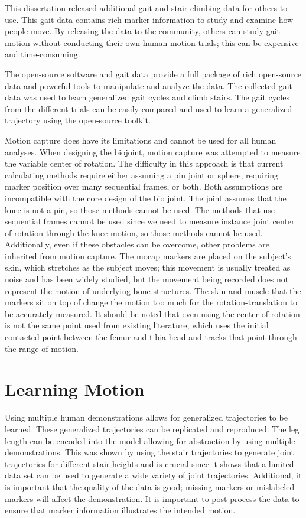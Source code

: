 This dissertation released additional gait and stair climbing data for others to use. This gait data contains rich marker information to study and examine how people move. By releasing the data to the community, others can study gait motion without conducting their own human motion trials; this can be expensive and time-consuming. 

The open-source software and gait data provide a full package of rich open-source data and powerful tools to manipulate and analyze the data. The collected gait data was used to learn generalized gait cycles and climb stairs. The gait cycles from the different trials can be easily compared and used to learn a generalized trajectory using the open-source toolkit. 

Motion capture does have its limitations and cannot be used for all human analyses. When designing the biojoint, motion capture was attempted to measure the variable center of rotation. The difficulty in this approach is that current calculating methods require either assuming a pin joint or sphere, requiring marker position over many sequential frames, or both. Both assumptions are incompatible with the core design of the bio joint. The joint assumes that the knee is not a pin, so those methods cannot be used. The methods that use sequential frames cannot be used since we need to measure instance joint center of rotation through the knee motion, so those methods cannot be used. Additionally, even if these obstacles can be overcome, other problems are inherited from motion capture. The mocap markers are placed on the subject's skin, which stretches as the subject moves; this movement is usually treated as noise and has been widely studied, but the movement being recorded does not represent the motion of underlying bone structures. The skin and muscle that the markers sit on top of change the motion too much for the rotation-translation to be accurately measured. It should be noted that even using the center of rotation is not the same point used from existing literature, which uses the initial contacted point between the femur and tibia head and tracks that point through the range of motion.

\section{Learning Motion}


Using multiple human demonstrations allows for generalized trajectories to be learned. These generalized trajectories can be replicated and reproduced. The leg length can be encoded into the model allowing for abstraction by using multiple demonstrations. This was shown by using the stair trajectories to generate joint trajectories for different stair heights and is crucial since it shows that a limited data set can be used to generate a wide variety of joint trajectories. Additional, it is important that the quality of the data is good; missing markers or mislabeled markers will affect the demonstration. It is important to post-process the data to ensure that marker information illustrates the intended motion. 

